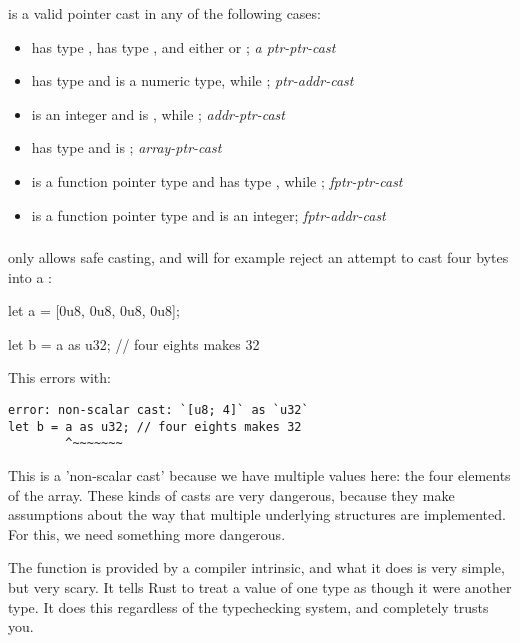  is a valid pointer cast in any of the following cases:

\begin{itemize}
  \item{ has type ,  has type , and either  or ; 
      \emph{a ptr-ptr-cast}}
  \item{ has type  and  is a numeric type, while ; \emph{ptr-addr-cast}}
  \item{ is an integer and  is , while ; \emph{addr-ptr-cast}}
  \item{ has type \code{\&[T; n]} and  is ; \emph{array-ptr-cast}}
  \item{ is a function pointer type and  has type , while ; \emph{fptr-ptr-cast}}
  \item{ is a function pointer type and  is an integer; \emph{fptr-addr-cast}}
\end{itemize}

\subsubsection*{}

 only allows safe casting, and will for example reject an attempt to cast four bytes into a :

\begin{rustc}
let a = [0u8, 0u8, 0u8, 0u8];

let b = a as u32; // four eights makes 32
\end{rustc}

This errors with:

\begin{verbatim}
error: non-scalar cast: `[u8; 4]` as `u32`
let b = a as u32; // four eights makes 32
        ^~~~~~~~
\end{verbatim}

This is a 'non-scalar cast' because we have multiple values here: the four elements of the array. These kinds of casts are very 
dangerous, because they make assumptions about the way that multiple underlying structures are implemented. For this, we need 
something more dangerous.

\blank

The  function is provided by a compiler intrinsic, and what it does is very simple, but very scary. It tells Rust 
to treat a value of one type as though it were another type. It does this regardless of the typechecking system, and completely 
trusts you.

